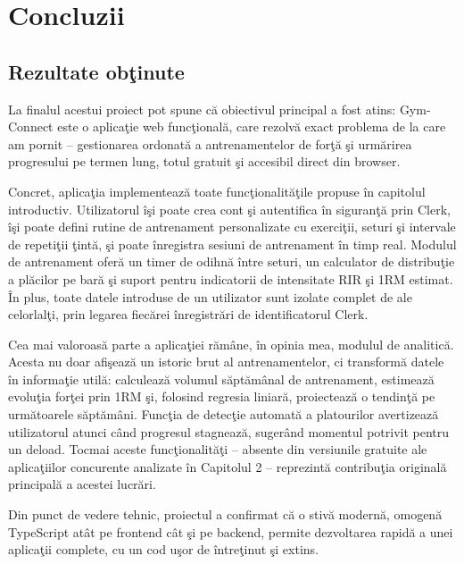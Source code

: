 \chapter{Concluzii}

\section{Rezultate ob\c tinute}

La finalul acestui proiect pot spune c\u a obiectivul principal a fost
atins: Gym-Connect este o aplica\c tie web func\c tional\u a, care
rezolv\u a exact problema de la care am pornit -- gestionarea ordonat\u a
a antrenamentelor de for\c t\u a \c si urm\u arirea progresului pe termen
lung, totul gratuit \c si accesibil direct din browser.

Concret, aplica\c tia implementeaz\u a toate func\c tionalit\u a\c tile
propuse \^ in capitolul introductiv. Utilizatorul \^ i\c si poate crea
cont \c si autentifica \^ in siguran\c t\u a prin Clerk, \^ i\c si poate
defini rutine de antrenament personalizate cu exerci\c tii, seturi \c si
intervale de repeti\c tii \c tint\u a, \c si poate \^ inregistra sesiuni
de antrenament \^ in timp real. Modulul de antrenament ofer\u a un timer
de odihn\u a \^ intre seturi, un calculator de distribu\c tie a pl\u acilor
pe bar\u a \c si suport pentru indicatorii de intensitate RIR \c si 1RM
estimat. \^ In plus, toate datele introduse de un utilizator sunt
izolate complet de ale celorlal\c ti, prin legarea fiec\u arei
\^ inregistr\u ari de identificatorul Clerk.

Cea mai valoroas\u a parte a aplica\c tiei r\u am\^ ane, \^ in opinia mea,
modulul de analitic\u a. Acesta nu doar afi\c seaz\u a un istoric brut
al antrenamentelor, ci transform\u a datele \^ in informa\c tie util\u a:
calculeaz\u a volumul s\u apt\u am\^ anal de antrenament, estimeaz\u a
evolu\c tia for\c tei prin 1RM \c si, folosind regresia liniar\u a,
proiecteaz\u a o tendin\c t\u a pe urm\u atoarele s\u apt\u am\^ ani.
Func\c tia de detec\c tie automat\u a a platourilor avertizeaz\u a
utilizatorul atunci c\^ and progresul stagneaz\u a, suger\^ and momentul
potrivit pentru un deload. Tocmai aceste func\c tionalit\u a\c ti --
absente din versiunile gratuite ale aplica\c tiilor concurente
analizate \^ in Capitolul 2 -- reprezint\u a contribu\c tia original\u a
principal\u a a acestei lucr\u ari.

Din punct de vedere tehnic, proiectul a confirmat c\u a o stiv\u a
modern\u a, omogen\u a TypeScript at\^ at pe frontend c\^ at \c si pe
backend, permite dezvoltarea rapid\u a a unei aplica\c tii complete,
cu un cod u\c sor de \^ intre\c tinut \c si extins.


